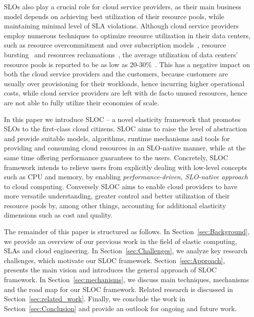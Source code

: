 SLOs also play a crucial role for cloud service providers, as
their main business model depends on achieving best utilization
of their resource pools, while maintaining minimal level of SLA 
violations. Although cloud service providers employ numerous
techniques to optimize resource utilization in their data centers,
such as resource overcommitment and over subscription models~\cite{TODO}, 
resource bursting~\cite{noonan2016managing} and resources reclamations~\cite{engle2015capacity},
the average utilization of data centers' resource pools is 
reported to be as low as 20-30\%~\cite{TODO}. This has a negative impact 
on both the cloud service providers and the customers, because
customers are usually over provisioning for their workloads, hence 
incurring higher operational costs, while cloud service providers
are left with de facto unused resources, hence are not able to 
fully utilize their economies of scale.


In this paper we introduce SLOC -- a novel elasticity framework that promotes SLOs to 
the first-class cloud citizens. SLOC aims to raise the level of 
abstraction and provide suitable models, algorithms, runtime mechanisms and tools
for providing and consuming cloud resources in an SLO-native manner, while
at the same time offering performance guarantees to the users. 
%
Concretely, SLOC framework intends to relieve users from explicitly 
dealing with low-level concepts such as CPU and memory, by enabling 
{\em performance-driven, SLO-native approach} to cloud computing. 
Conversely SLOC aims to  
enable cloud providers to have more versatile understanding, greater control 
and better utilization of their resource pools by, among other things,
accounting for additional elasticity dimensions such as cost and quality. 

The remainder of this paper is structured as follows. 
In Section~\ref{sec:Background}, we provide an overview of our previous
work in the field of elastic computing, SLAs and cloud engineering.
In Section~\ref{sec:Challenges}, we analyze key research challenges,
which motivate our SLOC framework.
Section~\ref{sec:Approach}, presents the main vision and introduces 
the general approach of SLOC framework.
In Section~\ref{sec:mechanisms}, we discuss main techniques,  
mechanisms and the road map for our SLOC framework.
Related research is discussed in Section~\ref{sec:related_work}.
Finally, we conclude the work in Section~\ref{sec:Conclusion} and provide an outlook for
ongoing and future work.